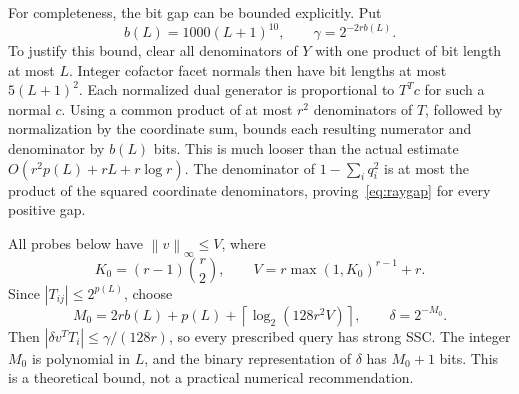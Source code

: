 \documentclass[11pt]{article}
\theoremstyle{definition}\newtheorem{definition}[theorem]{Definition}
\newcommand{\norm}[1]{\left\lVert#1\right\rVert}\newcommand{\Tr}{\mathcal T}
\begin{document}
For completeness, the bit gap can be bounded explicitly. Put
\begin{equation}
 b(L)=1000(L+1)^{10},\qquad \gamma=2^{-2rb(L)}.
 \label{eq:raygap}
\end{equation}
To justify this bound, clear all denominators of $Y$ with one product of bit length at most $L$. Integer cofactor facet normals then have bit lengths at most $5(L+1)^2$. Each normalized dual generator is proportional to $T^Tc$ for such a normal $c$. Using a common product of at most $r^2$ denominators of $T$, followed by normalization by the coordinate sum, bounds each resulting numerator and denominator by $b(L)$ bits. This is much looser than the actual estimate $O(r^2p(L)+rL+r\log r)$. The denominator of $1-\sum_iq_i^2$ is at most the product of the squared coordinate denominators, proving~\eqref{eq:raygap} for every positive gap.

All probes below have $\norm{v}_\infty\le V$, where
\begin{equation}
 K_0=(r-1)\binom r2,\qquad
 V=r\max(1,K_0)^{r-1}+r.
\end{equation}
Since $|T_{ij}|\le2^{p(L)}$, choose
\begin{equation}
 M_0=2rb(L)+p(L)+\left\lceil\log_2(128r^2V)\right\rceil,
 \qquad \delta=2^{-M_0}.
 \label{eq:safedelta}
\end{equation}
Then $|\delta v^TT_i|\le\gamma/(128r)$, so every prescribed query has strong SSC. The integer $M_0$ is polynomial in $L$, and the binary representation of $\delta$ has $M_0+1$ bits. This is a theoretical bound, not a practical numerical recommendation.
\end{document}
